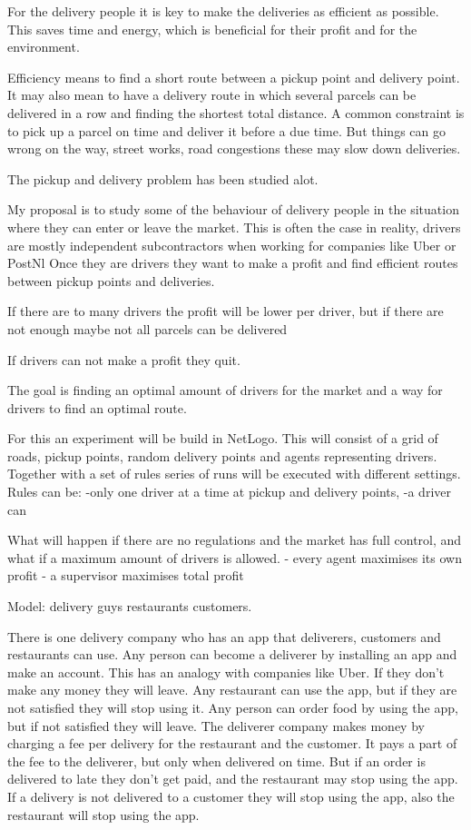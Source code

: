 For the delivery people it is key to make the deliveries as efficient as possible.
This saves time and energy, which is beneficial for their profit and for the environment.

Efficiency means to find a short route between a pickup point and delivery point.
It may also mean to have a delivery route in which several parcels can be delivered in a row and finding the shortest total distance.
A common constraint is to pick up a parcel on time and deliver it before a due time.
But things can go wrong on the way, street works, road congestions these may slow down deliveries.

The pickup and delivery problem has been studied alot.

My proposal is to study some of the behaviour of delivery people in the situation where they can enter or leave the market.
This is often the case in reality, drivers are mostly independent subcontractors when working for companies like Uber or PostNl
Once they are drivers they want to make a profit and find efficient routes between pickup points and deliveries.

If there are to many drivers the profit will be lower per driver, but if there are not enough maybe not all parcels can be delivered

If drivers can not make a profit they quit.

The goal is finding an optimal amount of drivers for the market and a way for drivers to find an optimal route.

For this an experiment will be build in NetLogo.
This will consist of a grid of roads, pickup points, random delivery points and agents representing drivers.
Together with a set of rules series of runs will be executed with different settings.
Rules can be:
-only one driver at a time at pickup and delivery points,
-a driver can

What will happen if there are no regulations and the market has full control, and what if a maximum amount of drivers is allowed.
- every agent maximises its own profit
- a supervisor maximises total profit

Model:
delivery guys
restaurants
customers.

There is one delivery company who has an app that deliverers, customers and restaurants can use.
Any person can become a deliverer by installing an app and make an account.
This has an analogy with companies like Uber.
If they don't make any money they will leave.
Any restaurant can use the app, but if they are not satisfied they will stop using it.
Any person can order food by using the app, but if not satisfied they will leave.
The deliverer company makes money by charging a fee per delivery for the restaurant and the customer.
It pays a part of the fee to the deliverer, but only when delivered on time.
But if an order is delivered to late they don't get paid, and the restaurant may stop using the app.
If a delivery is not delivered to a customer they will stop using the app, also the restaurant will stop using the app.


